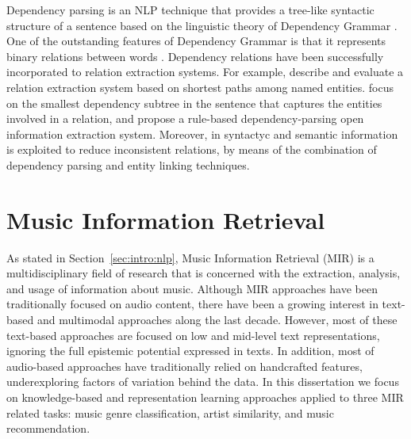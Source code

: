 Dependency parsing is an NLP technique that provides a tree-like syntactic structure of a sentence based on the linguistic theory of Dependency Grammar \citep{Tesniere1959}. One of the outstanding features of Dependency Grammar is that it represents binary relations between words \citep{BallesterosNivre2013}.%
Dependency relations have been successfully incorporated to relation extraction systems. For example, \cite{BunescuandMooney2005} describe and evaluate a relation extraction system based on shortest paths among named entities. \cite{CulottaSorensen2004} focus on the smallest dependency subtree in the sentence that captures the entities involved in a relation, and \cite{Gamallo2012} propose a rule-based dependency-parsing open information extraction system. Moreover, in \cite{Nakasholeetal2012,MoroandNavigli2012,DelliBovietal2015b} syntactyc and semantic information is exploited to reduce inconsistent relations, by means of the combination of dependency parsing and entity linking techniques.


\section{Music Information Retrieval}
\label{sec:SOA:mir}

As stated in Section~\ref{sec:intro:nlp}, Music Information Retrieval (MIR) is a multidisciplinary field of research that is concerned with the extraction, analysis, and usage of information about music. %
Although MIR approaches have been traditionally focused on audio content, there have been a growing interest in text-based and multimodal approaches along the last decade. However, most of these text-based approaches are focused on low and mid-level text representations, ignoring the full epistemic potential expressed in texts. In addition, most of audio-based approaches have traditionally relied on handcrafted features, underexploring factors of variation behind the data.
In this dissertation we focus on knowledge-based and representation learning approaches applied to three MIR related tasks: music genre classification, artist similarity, and music recommendation.

